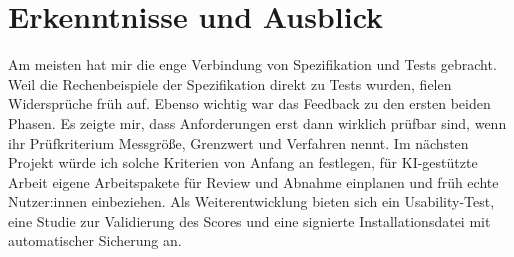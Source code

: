 \documentclass[abstract]{iu-pse}
\begin{document}
\section{Erkenntnisse und Ausblick}
Am meisten hat mir die enge Verbindung von Spezifikation und Tests gebracht. Weil die Rechenbeispiele der Spezifikation direkt zu Tests wurden, fielen Widersprüche früh auf. Ebenso wichtig war das Feedback zu den ersten beiden Phasen. Es zeigte mir, dass Anforderungen erst dann wirklich prüfbar sind, wenn ihr Prüfkriterium Messgröße, Grenzwert und Verfahren nennt. Im nächsten Projekt würde ich solche Kriterien von Anfang an festlegen, für KI-gestützte Arbeit eigene Arbeitspakete für Review und Abnahme einplanen und früh echte Nutzer:innen einbeziehen. Als Weiterentwicklung bieten sich ein Usability-Test, eine Studie zur Validierung des Scores und eine signierte Installationsdatei mit automatischer Sicherung an.

\end{document}
